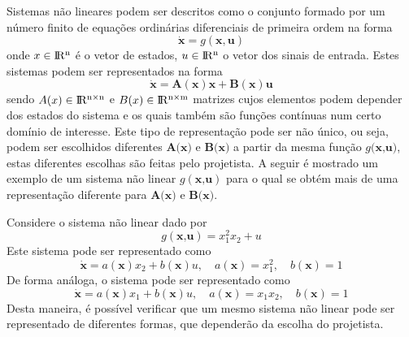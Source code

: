 Sistemas não lineares podem ser descritos como o conjunto formado por um número finito de equações ordinárias diferenciais de primeira ordem na forma
\begin{equation}\label{sist_nao_linear_generico}
\mathbf{\dot{x}}=g\mathbf{(x,u)}
\end{equation}
onde $x \in \rm I\!R^n$ é o vetor de estados, $u \in \rm I\!R^n$ o vetor dos sinais de entrada. Estes sistemas podem ser representados na forma
\begin{equation}\label{eq:noninear_system}
\mathbf{\dot{x}} = \mathbf{A(x)x} + \mathbf{B(x)u}
\end{equation}
sendo $A(x) \in\rm I\!R^{n \times n}$ e $B(x) \in \rm I\!R^{n \times m}$ matrizes cujos elementos podem depender dos estados do sistema e os quais também são funções contínuas num certo domínio de interesse. Este tipo de representação pode ser não único, ou seja, podem ser escolhidos diferentes $\textbf{A(x)}$ e $\textbf{B(x)}$ a partir da mesma função $g\textbf{(x,u)}$, estas diferentes escolhas são feitas pelo projetista. A seguir é mostrado um exemplo de um sistema não linear $g(\textbf{x,u})$ para o qual se obtém mais de uma representação diferente para $\textbf{A(x)}$ e $\textbf{B(x)}$.

\begin{example} Considere o sistema não linear dado por
	\begin{equation*}
		g(\textbf{x,u}) = x_1^2x_2+u
	\end{equation*}
	Este sistema pode ser representado como
	\begin{equation*}
	\dot{\textbf{x}} = a(\textbf{x})x_2+b(\textbf{x})u,\quad a(\textbf{x}) = x_1^2,\quad b(\textbf{x}) = 1
	\end{equation*}
	De forma análoga, o sistema pode ser representado como
	\begin{equation*}
	\dot{\textbf{x}} = a(\textbf{x})x_1+b(\textbf{x})u,\quad a(\textbf{x}) = x_1x_2,\quad b(\textbf{x}) = 1
	\end{equation*}
	Desta maneira, é possível verificar que um mesmo sistema não linear pode ser representado de diferentes formas, que dependerão da escolha do projetista.
	\label{ex:nonlinear_system_multiple_representation}
\end{example}

